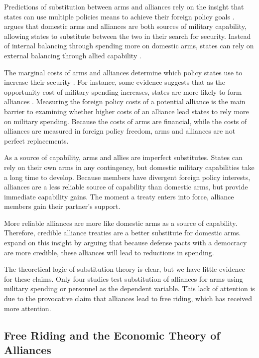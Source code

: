 \documentclass[12pt]{article}
\begin{document}
Predictions of substitution between arms and alliances rely on the insight that states can use multiple policies means to achieve their foreign policy goals \citep{MostStarr1989}. \citet{Morrow1993} argues that domestic arms and alliances are both sources of military capability, allowing states to substitute between the two in their search for security. Instead of internal balancing through spending more on domestic arms, states can rely on external balancing through allied capability \citep{Conybeare1992}. 

The marginal costs of arms and alliances determine which policy states use to increase their security \citep{Sorokin1994}. For instance, some evidence suggests that as the opportunity cost of military spending increases, states are more likely to form alliances \citep{Kimball2010, AllenDigiuseppe2013}. Measuring the foreign policy costs of a potential alliance is the main barrier to examining whether higher costs of an alliance lead states to rely more on military spending. Because the costs of arms are financial, while the costs of alliances are measured in foreign policy freedom, arms and alliances are not perfect replacements. 

As a source of capability, arms and allies are imperfect substitutes. States can rely on their own arms in any contingency, but domestic military capabilities take a long time to develop. Because members have divergent foreign policy interests, alliances are a less reliable source of capability than domestic arms, but provide immediate capability gains. The moment a treaty enters into force, alliance members gain their partner's support.

More reliable alliances are more like domestic arms as a source of capability. Therefore, credible alliance treaties are a better substitute for domestic arms. \citet{DigiuseppePoast2016} expand on this insight by arguing that because defense pacts with a democracy are more credible, these alliances will lead to reductions in spending. 

The theoretical logic of substitution theory is clear, but we have little evidence for these claims. Only four studies test substitution of alliances for arms using military spending or personnel as the dependent variable. This lack of attention is due to the provocative claim that alliances lead to free riding, which has received more attention. 

\subsection*{Free Riding and the Economic Theory of Alliances} 
\end{document}
